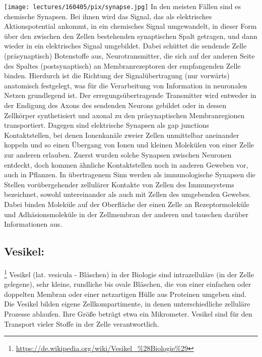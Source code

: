 \texttt{[image: lectures/160405/pix/synapse.jpg]}
In den meisten Fällen sind es chemische Synapsen. Bei ihnen wird das Signal, das als elektrisches Aktionspotential ankommt, in ein chemisches Signal umgewandelt, in dieser Form über den zwischen den Zellen bestehenden synaptischen Spalt getragen, und dann wieder in ein elektrisches Signal umgebildet. Dabei schüttet die sendende Zelle (präsynaptisch) Botenstoffe aus, Neurotransmitter, die sich auf der anderen Seite des Spaltes (postsynaptisch) an Membranrezeptoren der empfangenden Zelle binden. Hierdurch ist die Richtung der Signalübertragung (nur vorwärts) anatomisch festgelegt, was für die Verarbeitung von Information in neuronalen Netzen grundlegend ist. Der erregungsübertragende Transmitter wird entweder in der Endigung des Axons des sendenden Neurons gebildet oder in dessen Zellkörper synthetisiert und axonal zu den präsynaptischen Membranregionen transportiert.
Dagegen sind elektrische Synapsen als gap junctions Kontaktstellen, bei denen Ionenkanäle zweier Zellen unmittelbar aneinander koppeln und so einen Übergang von Ionen und kleinen Molekülen von einer Zelle zur anderen erlauben. Zuerst wurden solche Synapsen zwischen Neuronen entdeckt, doch kommen ähnliche Kontaktstellen noch in anderen Geweben vor, auch in Pflanzen.
In übertragenem Sinn werden als immunologische Synapsen die Stellen vorübergehender zellulärer Kontakte von Zellen des Immunsystems bezeichnet, sowohl untereinander als auch mit Zellen des umgebenden Gewebes. Dabei binden Moleküle auf der Oberfläche der einen Zelle an Rezeptormoleküle und Adhäsionsmoleküle in der Zellmembran der anderen und tauschen darüber Informationen aus.

\subsection{Vesikel:}\footnote{\url{https://de.wikipedia.org/wiki/Vesikel_\%28Biologie\%29}} Vesikel (lat. vesicula - Bläschen) in der Biologie sind intrazelluläre (in der Zelle gelegene), sehr kleine, rundliche bis ovale Bläschen, die von einer einfachen oder doppelten Membran oder einer netzartigen Hülle aus Proteinen umgeben sind. Die Vesikel bilden eigene Zellkompartimente, in denen unterschiedliche zelluläre Prozesse ablaufen. Ihre Größe beträgt etwa ein Mikrometer. Vesikel sind für den Transport vieler Stoffe in der Zelle verantwortlich.

